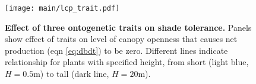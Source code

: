\documentclass[a4paper,11pt]{article}
\begin{document}
\newpage

\begin{figure}[ht]
\centering
\texttt{[image: main/lcp\_trait.pdf]}
\caption{\textbf{Effect of three ontogenetic traits on shade tolerance.}
Panels show effect of traits on level of canopy openness that causes net production (eqn \ref{eq:dbdt}) to be zero. Different lines indicate relationship for plants with specified height, from short (light blue,  $H=0.5$m) to tall (dark line, $H=20$m).
\label{fig:wplcp}}
\end{figure}

\clearpage

\footnotesize


\end{document}
